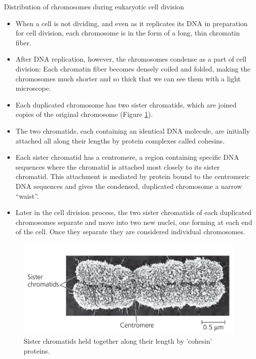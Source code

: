 \documentclass[11pt,dvipsnames,ignorenonframetext,aspectratio=169]{beamer}
\providecommand{\tightlist}{%
  \setlength{\itemsep}{0pt}\setlength{\parskip}{0pt}}
\begin{document}
\begin{frame}{Distribution of chromosomes during eukaryotic cell
division}
\protect\hypertarget{distribution-of-chromosomes-during-eukaryotic-cell-division}{}
\begin{itemize}
\tightlist
\item
  When a cell is not dividing, and even as it replicates its DNA in
  preparation for cell division, each chromosome is in the form of a
  long, thin chromatin fiber.
\item
  After DNA replication, however, the chromosomes condense as a part of
  cell division: Each chromatin fiber becomes densely coiled and folded,
  making the chromosomes much shorter and so thick that we can see them
  with a light microscope.
\item
  Each duplicated chromosome has two sister chromatids, which are joined
  copies of the original chromosome (Figure
  \ref{fig:duplicated-chromosome}).
\item
  The two chromatids, each containing an identical DNA molecule, are
  initially attached all along their lengths by protein complexes called
  cohesins.
\end{itemize}
\end{frame}

\begin{frame}{}
\protect\hypertarget{section-6}{}
\begin{itemize}
\tightlist
\item
  Each sister chromatid has a centromere, a region containing specific
  DNA sequences where the chromatid is attached most closely to its
  sister chromatid. This attachment is mediated by protein bound to the
  centromeric DNA sequences and gives the condensed, duplicated
  chromosome a narrow ``waist''.
\item
  Later in the cell division process, the two sister chromatids of each
  duplicated chromosomes separate and move into two new nuclei, one
  forming at each end of the cell. Once they separate they are
  considered individual chromosomes.
\end{itemize}
\end{frame}

\begin{frame}{}
\protect\hypertarget{section-7}{}
\begin{figure}

{\centering \includegraphics[width=0.8\linewidth]{../images/duplicated_chromosomes_hd} 

}

\caption{Sister chromatids held together along their length by 'cohesin' proteins.}\label{fig:duplicated-chromosome}
\end{figure}
\end{frame}
\end{document}
